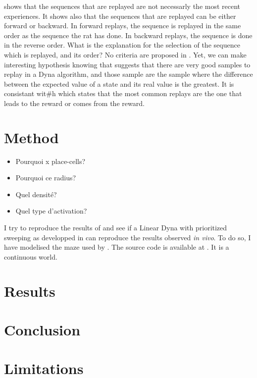 \documentclass[]{article}
\newcommand\bla[1]{\ifthenelse{\isempty{#1}}{\hl{**~bla~bla~**}}{\hl{**~#1~**}}}
\begin{document}
\textcite{gupta_hippocampal_2010} shows that the sequences that are replayed are not necessarly the most recent experiences. It shows also that the sequences that are replayed can be either forward or backward. In forward replays, the sequence is replayed in the same order as the sequence the rat has done. In backward replays, the sequence is done in the reverse order. What is the explanation for the selection of the sequence which is replayed, and its order? No criteria are proposed in \textcite{gupta_hippocampal_2010}. Yet, we can make interesting hypothesis knowing that \textcite{sutton_dyna-style_2012} suggests that there are very good samples to replay in a Dyna algorithm, and those sample are the sample where the difference between the expected value of a state and its real value is the greatest. It is consistant wit#h \textcite{gupta_hippocampal_2010} which states that the most common replays are the one that leads to the reward or comes from the reward.

\section{Method}\label{method}
\begin{itemize}
  \item Pourquoi x place-cells?
  \item Pourquoi ce radius?
  \item Quel densité?
  \item Quel type d'activation?
\end{itemize}

I try to reproduce the results of \textcite{gupta_hippocampal_2010} and see if a Linear Dyna with prioritized sweeping as developped in \textcite{sutton_dyna-style_2012} can reproduce the results observed \emph{in vivo}. To do so, I have modelised the maze used by \textcite{gupta_hippocampal_2010}. The source code is available at \bla{github}. It is a continuous world.

\section{Results}\label{results}

\section{Conclusion}\label{conclusion}

\section{Limitations}\label{limitations}


\printbibliography{}
\end{document}
